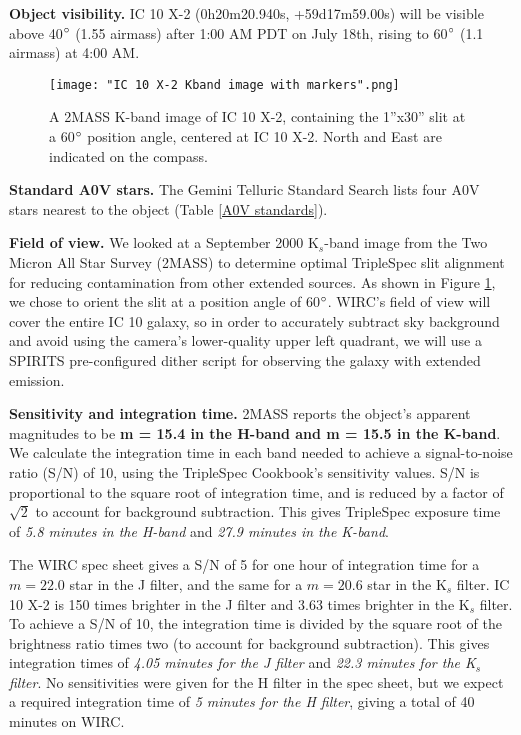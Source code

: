 \documentclass{article}
\begin{document}
\vspace{0ex}
\noindent\textbf{Object visibility.} IC 10 X-2 (0h20m20.940s, +59d17m59.00s) will be visible above 40$\degree$ (1.55 airmass) after 1:00 AM PDT on July 18th, rising to 60$\degree$ (1.1 airmass) at 4:00 AM. 

\begin{wrapfigure}{l}{0.3\textwidth}
  \vspace{-2ex}
  \texttt{[image: "IC 10 X-2 Kband image with markers".png]}
  \caption{A 2MASS K-band image of IC 10 X-2, containing the 1''x30'' slit at a 60$\degree$ position angle, centered at IC 10 X-2. North and East are indicated on the compass.}
  \label{fig:IC 10 X-2 TripleSpec slit orientation}
\end{wrapfigure}


\noindent \textbf{Standard A0V stars.}
The Gemini Telluric Standard Search lists four A0V stars nearest to the object (Table \ref{A0V standards}).


\noindent\textbf{Field of view.} 
We looked at a September 2000 K$_s$-band image from the Two Micron All Star Survey (2MASS) to determine optimal TripleSpec slit alignment for reducing contamination from other extended sources. As shown in Figure \ref{fig:IC 10 X-2 TripleSpec slit orientation}, we chose to orient the slit at a position angle of 60$\degree$.
WIRC's field of view will cover the entire IC 10 galaxy, so in order to accurately subtract sky background and avoid using the camera's lower-quality upper left quadrant, we will use a SPIRITS pre-configured dither script for observing the galaxy with extended emission.  

\vspace{1ex}
\noindent \textbf{Sensitivity and integration time.}
2MASS reports the object's apparent magnitudes to be \textbf{m = 15.4 in the H-band and m = 15.5 in the K-band}. We calculate the integration time in each band needed to achieve a signal-to-noise ratio (S/N) of 10, using the TripleSpec Cookbook's sensitivity values. S/N is proportional to the square root of integration time, and is reduced by a factor of $\sqrt{2}$ to account for background subtraction. This gives TripleSpec exposure time of \textit{5.8 minutes in the H-band} and \textit{27.9 minutes in the K-band}.


The WIRC spec sheet gives a S/N of 5 for one hour of integration time for a $m = 22.0$ star in the J filter, and the same for a $m = 20.6$ star in the K$_s$ filter. IC 10 X-2 is 150 times brighter in the J filter and 3.63 times brighter in the K$_s$ filter. To achieve a S/N of 10, the integration time is divided by the square root of the brightness ratio times two (to account for background subtraction). This gives integration times of \textit{4.05 minutes for the J filter} and \textit{22.3 minutes for the K$_s$ filter}. No sensitivities were given for the H filter in the spec sheet, but we expect a required integration time of \textit{5 minutes for the H filter}, giving a total of 40 minutes on WIRC.
\end{document}
